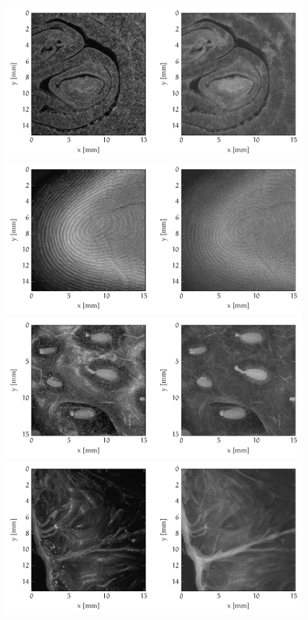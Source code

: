 \begin{figure}[hbt]
	\myfloatalign
	{\label{fig:fig:onion-surf}
		\includegraphics[width=1\linewidth]{gfx/ch4/axsun/enface/onion-surf}}\\
	{\label{fig:enface-fingerprint}
		\includegraphics[width=1\linewidth]{gfx/ch4/santec/fingervolume-2}}\\
	{\label{fig:strawberry-surf}
		\includegraphics[width=1\linewidth]{gfx/ch4/axsun/enface/strawberry-surf}}\\
	{\label{fig:fig:orange-surf}
		\includegraphics[width=1\linewidth]{gfx/ch4/axsun/enface/orange-surf}}\\

\end{figure}
